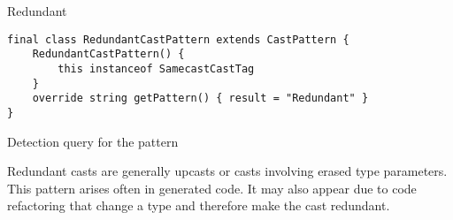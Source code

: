 \begin{pattern}{Redundant}
\begin{listing}
\begin{verbatim}
final class RedundantCastPattern extends CastPattern {
    RedundantCastPattern() {
        this instanceof SamecastCastTag
    } 
    override string getPattern() { result = "Redundant" }
}
\end{verbatim}
\caption{Detection query for the \thisp{} pattern}
\end{listing}

\issues{}
Redundant casts are generally upcasts or casts involving erased type parameters.
This pattern arises often in generated code.
It may also appear due to code refactoring that change a type and therefore make the cast redundant.
    
\end{pattern}
